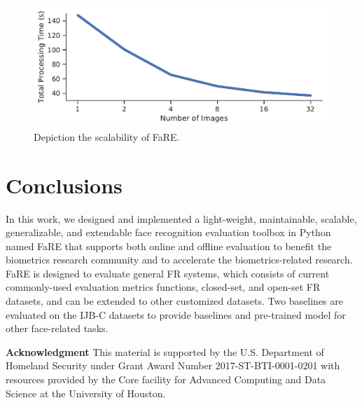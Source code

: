 \documentclass{article}
\begin{document}
\begin{figure}[htb]
    \centering
    \centerline{\includegraphics[width=\linewidth]{FaRE-Scalability}}
    \vspace{-1em}
    \caption{Depiction the scalability of FaRE.}
    \vspace{-0.5em}    
    \label{FIG:FaRE-IM-TIME}
\end{figure}

\section{Conclusions}
\label{SEC:FaRE-Cons}
In this work, we designed and implemented a light-weight, maintainable, scalable, generalizable, and extendable face recognition evaluation toolbox in Python named FaRE that supports both online and offline evaluation to benefit the biometrics research community and to accelerate the biometrics-related research.
FaRE is designed to evaluate general FR systems, which consists of current commonly-used evaluation metrics functions, closed-set, and open-set FR datasets, and can be extended to other customized datasets. 
Two baselines are evaluated on the IJB-C datasets to provide baselines and pre-trained model for other face-related tasks.

\smallbreak
\small{
\noindent \textbf{Acknowledgment}
This material is supported by the U.S. Department of Homeland Security under Grant Award Number 2017-ST-BTI-0001-0201 with resources provided by the Core facility for Advanced Computing and Data Science at the University of Houston.
}

\pagebreak
{
\small


}
\end{document}
